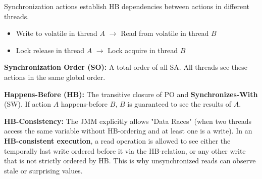 \begin{remark}
    Synchronization actions establish HB dependencies between actions in different threads.
    \begin{itemize}
        \item Write to volatile in thread $A$ $\rightarrow$ Read from volatile in thread $B$
        \item Lock release in thread $A$ $\rightarrow$ Lock acquire in thread $B$
    \end{itemize}
\end{remark}

\begin{definition} 
    \textbf{Synchronization Order (SO):} A total order of all SA. All threads see these actions in the same global order.
\end{definition}

\begin{definition} 
    \textbf{Happens-Before (HB):} The transitive closure of PO and \textbf{Synchronizes-With} (SW). If action $A$ happens-before $B$, $B$ is guaranteed to see the results of $A$.
\end{definition}

\begin{remark}
    \textbf{HB-Consistency:} The JMM explicitly allows "Data Races" (when two threads access the same variable without HB-ordering and at least one is a write). In an \textbf{HB-consistent execution}, a read operation is allowed to see either the temporally last write ordered before it via the HB-relation, or any other write that is not strictly ordered by HB. This is why unsynchronized reads can observe stale or surprising values.
\end{remark}